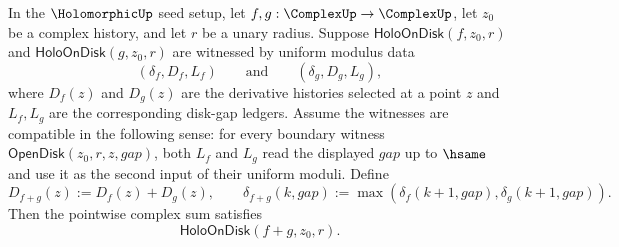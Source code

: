 \begin{theorem}
\label{thm:holo-on-disk-additive-closure}
In the $\HolomorphicUp$ seed setup, let $f,g:\ComplexUp\to\ComplexUp$, let $z_0$ be a complex history, and let $r$ be a unary radius. Suppose $\mathsf{HoloOnDisk}(f,z_0,r)$ and $\mathsf{HoloOnDisk}(g,z_0,r)$ are witnessed by uniform modulus data
$$
(\delta_f,D_f,L_f)\qquad\text{and}\qquad(\delta_g,D_g,L_g),
$$
where $D_f(z)$ and $D_g(z)$ are the derivative histories selected at a point $z$ and $L_f,L_g$ are the corresponding disk-gap ledgers. Assume the witnesses are compatible in the following sense: for every boundary witness $\mathsf{OpenDisk}(z_0,r,z,gap)$, both $L_f$ and $L_g$ read the displayed $gap$ up to $\hsame$ and use it as the second input of their uniform moduli. Define
$$
D_{f+g}(z):=D_f(z)+D_g(z),
\qquad
\delta_{f+g}(k,gap):=\max(\delta_f(k+1,gap),\delta_g(k+1,gap)).
$$
Then the pointwise complex sum satisfies
$$
\mathsf{HoloOnDisk}(f+g,z_0,r).
$$
\end{theorem}
